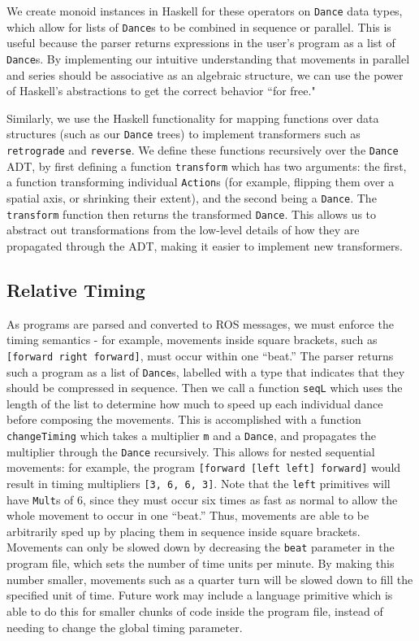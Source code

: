 \documentclass[sigconf]{acmart}
\begin{document}
We create monoid instances in Haskell for these operators on
\texttt{Dance} data types, which allow for lists of \texttt{Dance}s to be combined
in sequence or parallel. This is useful because the parser returns expressions
in the user's program as a list of \texttt{Dance}s. By implementing our intuitive understanding that movements in parallel and
series should be associative as an algebraic structure, we can use the power of Haskell's abstractions to
get the correct behavior ``for free."

Similarly, we use the Haskell functionality for mapping functions over data structures
(such as our \texttt{Dance} trees) to implement transformers such as
\texttt{retrograde} and \texttt{reverse}. We define these functions recursively
over the \texttt{Dance} ADT, by first defining a function \texttt{transform}
which has two arguments: the first, a function transforming individual
\texttt{Action}s (for example, flipping them over a spatial axis, or shrinking
their extent), and the
second being a \texttt{Dance}. The \texttt{transform} function then returns the
transformed \texttt{Dance}. This allows us to abstract out transformations from the
low-level details of how they are propagated through the ADT, making it easier
to implement new transformers.

\subsection{Relative Timing}\label{relative-timing}

As programs are parsed and converted to ROS messages, we must enforce the timing semantics - for example, movements
inside square brackets, such as \texttt{{[}forward\ right\ forward{]}},
must occur within one ``beat.'' The parser returns such a program as a list of \texttt{Dance}s, labelled with a type
that indicates that they should be compressed in sequence.
Then we call a function \texttt{seqL} which uses the length of the
 list to determine how much to speed up each individual dance
before composing the movements. This is accomplished with a function
\texttt{changeTiming} which takes a multiplier \texttt{m} and a
\texttt{Dance}, and propagates the multiplier through the \texttt{Dance}
recursively. This allows for nested sequential movements: for example,
the program \texttt{{[}forward\ {[}left\ left{]}\ forward{]}} would
result in timing multipliers \texttt{[3, 6, 6, 3]}. Note that the \texttt{left}
primitives will have \texttt{Mult}s of 6, since
they must occur six times as fast as normal to allow the whole movement
to occur in one ``beat.'' Thus, movements are able to be arbitrarily sped up by
placing them in sequence inside square brackets. Movements can only be slowed
down by decreasing the \texttt{beat} parameter in the program file, which sets
the number of time units per minute. By making this number smaller, movements
such as a quarter turn will be slowed down to fill the specified unit of time.
Future work may include a language primitive which is able to do this for
smaller chunks of code inside the program file, instead of needing to change the
global timing parameter.
\end{document}
